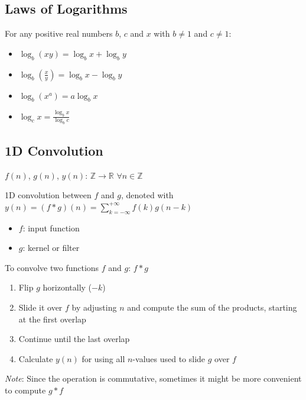 \subsection{Laws of Logarithms}
For any positive real numbers $b$, $c$ and $x$ with $b \neq 1$ and $c \neq 1$:

\begin{itemize}
  \item $\log_{b}(xy) = \log_{b}x + \log_{b}y$
  \item $\log_{b}(\frac{x}{y}) = \log_{b}x - \log_{b}y$
  \item $\log_{b}(x^{a}) = a \log_{b}x$
  \item $\log_{c}x = \frac{\log_{b}x}{\log_{b}c}$
\end{itemize}

\subsection{1D Convolution}
$f(n)$, $g(n)$, $y(n)$: $\mathbb{Z} \to \mathbb{R}$ \quad $\forall n \in \mathbb{Z}$

1D convolution between $f$ and $g$, denoted with $y(n) = (f * g)(n) = \sum_{k = -\infty}^{+\infty} f(k) g(n-k)$

\begin{itemize}
  \item $f$: input function
  \item $g$: kernel or filter
\end{itemize}

To convolve two functions $f$ and $g$: $f * g$
\begin{enumerate}
  \item Flip $g$ horizontally ($-k$)
  \item Slide it over $f$ by adjusting $n$ and compute the sum of the products, starting at the first overlap
  \item Continue until the last overlap
  \item Calculate $y(n)$ for using all $n$-values used to slide $g$ over $f$
\end{enumerate}

\textit{Note}: Since the operation is commutative, sometimes it might be more convenient to compute $g * f$

